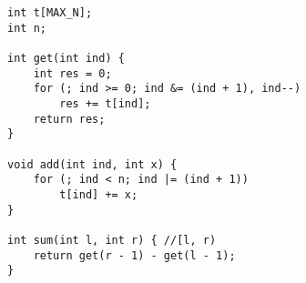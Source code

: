 \begin{verbatim}
int t[MAX_N];
int n;

int get(int ind) {
	int res = 0;
	for (; ind >= 0; ind &= (ind + 1), ind--)
		res += t[ind];
	return res;
}

void add(int ind, int x) {
	for (; ind < n; ind |= (ind + 1))	
		t[ind] += x;
}

int sum(int l, int r) { //[l, r)
	return get(r - 1) - get(l - 1);
}
\end{verbatim}
